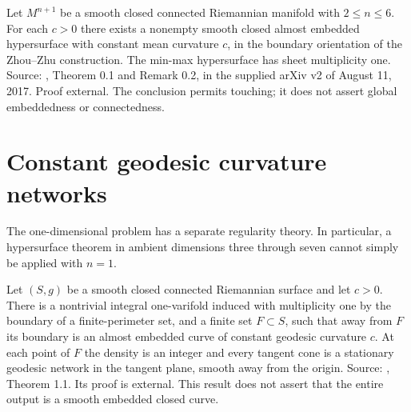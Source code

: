 \begin{theorem}\label{thm:zhou-zhu-cmc}
Let $M^{n+1}$ be a smooth closed connected Riemannian manifold with $2\leq n\leq6$. For each $c>0$ there exists a nonempty smooth closed almost embedded hypersurface with constant mean curvature $c$, in the boundary orientation of the Zhou--Zhu construction. The min-max hypersurface has sheet multiplicity one. Source: \cite{ZZCMC}, Theorem 0.1 and Remark 0.2, in the supplied arXiv v2 of August 11, 2017. Proof external. The conclusion permits touching; it does not assert global embeddedness or connectedness.
\end{theorem}

\chapter{Constant geodesic curvature networks}\label{sec:curvature-networks}
The one-dimensional problem has a separate regularity theory. In particular, a hypersurface theorem in ambient dimensions three through seven cannot simply be applied with $n=1$.

\begin{theorem}\label{thm:zhou-zhu-networks}
Let $(S,g)$ be a smooth closed connected Riemannian surface and let $c>0$. There is a nontrivial integral one-varifold induced with multiplicity one by the boundary of a finite-perimeter set, and a finite set $F\subset S$, such that away from $F$ its boundary is an almost embedded curve of constant geodesic curvature $c$. At each point of $F$ the density is an integer and every tangent cone is a stationary geodesic network in the tangent plane, smooth away from the origin. Source: \cite{ZZNet}, Theorem 1.1. Its proof is external. This result does not assert that the entire output is a smooth embedded closed curve.
\end{theorem}
